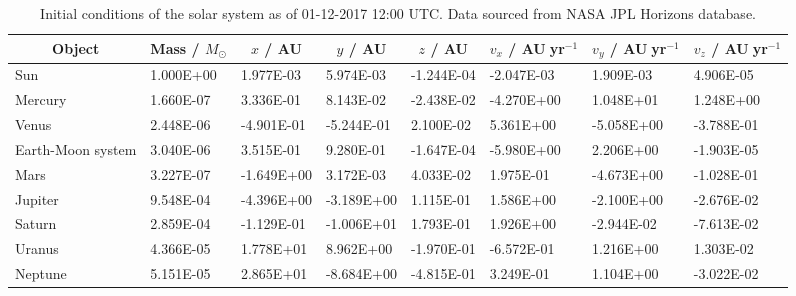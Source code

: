 \begin{table}
\caption[Initial conditions]{Initial conditions of the solar system as of 01-12-2017 12:00 UTC. Data sourced from NASA JPL Horizons database.}\vspace{3ex}
\label{table:init_con}
\begin{tabular}{llllllll} \toprule \toprule
\multicolumn{1}{c}{Object} & \multicolumn{1}{c}{Mass / $M_{\odot}$} & \multicolumn{1}{c}{$x$ / AU} & \multicolumn{1}{c}{$y$ / AU} & \multicolumn{1}{c}{$z$ / AU} & \multicolumn{1}{c}{$v_x$ / AU$\;$yr$^{-1}$}& \multicolumn{1}{c}{$v_y$  / AU$\;$yr$^{-1}$}& \multicolumn{1}{c}{$v_z$  / AU$\;$yr$^{-1}$}\\ \midrule
Sun & 1.000E+00 & 1.977E-03 & 5.974E-03 & -1.244E-04 & -2.047E-03 & 1.909E-03 & 4.906E-05 \\
Mercury & 1.660E-07 & 3.336E-01 & 8.143E-02 & -2.438E-02 & -4.270E+00 & 1.048E+01 & 1.248E+00 \\
Venus & 2.448E-06 & -4.901E-01 & -5.244E-01 & 2.100E-02 & 5.361E+00 & -5.058E+00 & -3.788E-01 \\
Earth-Moon system & 3.040E-06 & 3.515E-01 & 9.280E-01 & -1.647E-04 & -5.980E+00 & 2.206E+00 & -1.903E-05 \\
Mars & 3.227E-07 & -1.649E+00 & 3.172E-03 & 4.033E-02 & 1.975E-01 & -4.673E+00 & -1.028E-01 \\
Jupiter & 9.548E-04 & -4.396E+00 & -3.189E+00 & 1.115E-01 & 1.586E+00 & -2.100E+00 & -2.676E-02 \\
Saturn & 2.859E-04 & -1.129E-01 & -1.006E+01 & 1.793E-01 & 1.926E+00 & -2.944E-02 & -7.613E-02 \\
Uranus & 4.366E-05 & 1.778E+01 & 8.962E+00 & -1.970E-01 & -6.572E-01 & 1.216E+00 & 1.303E-02 \\
Neptune & 5.151E-05 & 2.865E+01 & -8.684E+00 & -4.815E-01 & 3.249E-01 & 1.104E+00 & -3.022E-02 \\
\bottomrule
\end{tabular}
\end{table}
